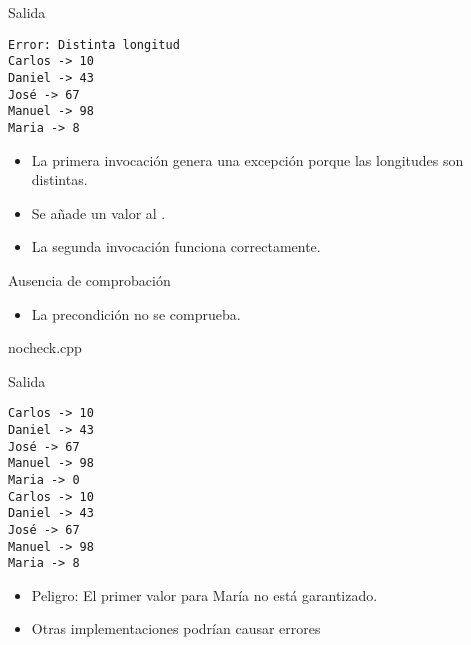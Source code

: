 \begin{frame}[t,fragile]{Salida}
\begin{lstlisting}[style=terminal]
Error: Distinta longitud
Carlos -> 10
Daniel -> 43
José -> 67
Manuel -> 98
Maria -> 8
\end{lstlisting}
\begin{itemize}
  \item La primera invocación genera una excepción porque las longitudes son distintas.
  \item Se añade un valor al .
  \item La segunda invocación funciona correctamente.
\end{itemize}
\end{frame}


\begin{frame}{Ausencia de comprobación}
\begin{itemize}
  \item La precondición no se comprueba.
\end{itemize}
\pause
\begin{block}{nocheck.cpp}
\end{block}
\end{frame}


\begin{frame}[fragile]{Salida}
\begin{lstlisting}[style=terminal]
Carlos -> 10
Daniel -> 43
José -> 67
Manuel -> 98
Maria -> 0
Carlos -> 10
Daniel -> 43
José -> 67
Manuel -> 98
Maria -> 8
\end{lstlisting}
\begin{itemize}
  \item \alert{Peligro}: El primer valor para María no está garantizado.
  \item Otras implementaciones podrían causar errores
\end{itemize}
\end{frame}

